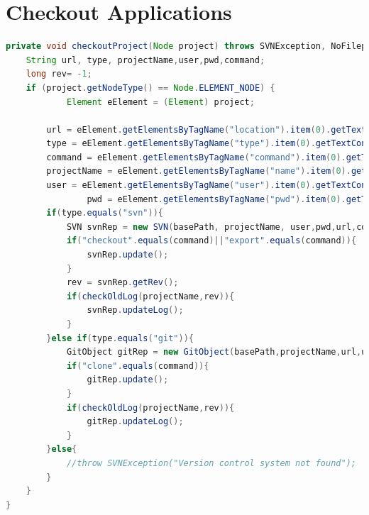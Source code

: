 \documentclass{article}
\begin{document}
\newpage
\section{Checkout Applications}
\label{AppendixD}


\begin{lstlisting}[frame=single ,language=Java]
private void checkoutProject(Node project) throws SVNException, NoFilepatternException,GitAPIException,WrongRepositoryStateException, InvalidConfigurationException, DetachedHeadException, InvalidRemoteException, CanceledException, RefNotFoundException, NoHeadException,IOException {
	String url, type, projectName,user,pwd,command;
	long rev= -1;
	if (project.getNodeType() == Node.ELEMENT_NODE) {
			Element eElement = (Element) project;

		url = eElement.getElementsByTagName("location").item(0).getTextContent();
		type = eElement.getElementsByTagName("type").item(0).getTextContent();
		command = eElement.getElementsByTagName("command").item(0).getTextContent();
		projectName = eElement.getElementsByTagName("name").item(0).getTextContent();
		user = eElement.getElementsByTagName("user").item(0).getTextContent();
                pwd = eElement.getElementsByTagName("pwd").item(0).getTextContent();	
		if(type.equals("svn")){
			SVN svnRep = new SVN(basePath, projectName, user,pwd,url,command);
			if("checkout".equals(command)||"export".equals(command)){
			 	svnRep.update();
			}	
			rev = svnRep.getRev();
			if(checkOldLog(projectName,rev)){
				svnRep.updateLog();
			}
		}else if(type.equals("git")){
			GitObject gitRep = new GitObject(basePath,projectName,url,user,pwd);
			if("clone".equals(command)){
				gitRep.update();
			}
			if(checkOldLog(projectName,rev)){
				gitRep.updateLog();
			}
		}else{
			//throw SVNException("Version control system not found");
		}
	}	
}
\end{lstlisting}
\end{document}
